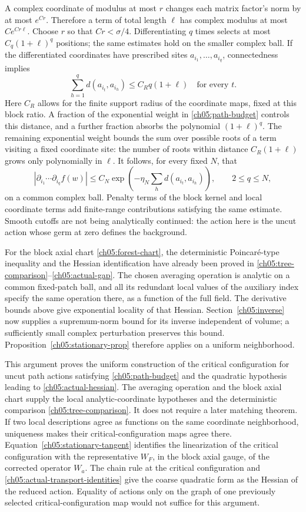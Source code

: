 A complex coordinate of modulus at most $r$ changes each matrix
factor's norm by at most $e^{Cr}$. Therefore a term of total
length $\ell$ has complex modulus at most $Ce^{Cr\ell}$.
Choose $r$ so that $Cr<\sigma/4$. Differentiating $q$ times
selects at most $C_q(1+\ell)^q$ positions; the same estimates
hold on the smaller complex ball. If the differentiated
coordinates have prescribed sites $a_{i_1},\ldots,a_{i_q}$,
connectedness implies
\[
 \sum_{h=1}^q d(a_{i_t},a_{i_h})\le C_R q(1+\ell)
             \quad\text{for every }t .
\]
Here $C_R$ allows for the finite support radius of the coordinate
maps, fixed at this block ratio. A fraction of the exponential
weight in \eqref{ch05:path-budget} controls this distance, and a
further fraction absorbs the polynomial $(1+\ell)^q$.
The remaining exponential weight bounds the sum over possible
roots of a term visiting a fixed coordinate site: the number of roots
within distance $C_R(1+\ell)$ grows only polynomially in $\ell$.
It follows, for every fixed $N$, that
\[
 |\partial_{i_1}\cdots\partial_{i_q}f(w)|
 \le C_N\exp\left(-\eta_N
                 \sum_h d(a_{i_t},a_{i_h})\right),
 \qquad 2\le q\le N ,
\]
on a common complex ball. Penalty terms of the block kernel and
local coordinate terms add finite-range contributions satisfying
the same estimate. Smooth cutoffs are not being analytically
continued: the action here is the uncut action whose germ at
zero defines the background.

For the block axial chart \eqref{ch05:forest-chart}, the deterministic
Poincar\'e-type inequality and the Hessian identification have already been proved
in \eqref{ch05:tree-comparison}--\eqref{ch05:actual-gap}. The chosen
averaging operation is analytic on a common fixed-patch ball, and all its redundant
local values of the auxiliary index specify the same operation there, as a function of the full field.
The derivative bounds above give exponential locality of that
Hessian. Section~\ref{ch05:inverse} now supplies a supremum-norm
bound for its inverse independent of volume; a sufficiently
small complex perturbation preserves this bound.
Proposition~\ref{ch05:stationary-prop} therefore applies on a
uniform neighborhood.

This argument proves the uniform construction of the critical configuration for
uncut path actions satisfying \eqref{ch05:path-budget} and the
quadratic hypothesis leading to
\eqref{ch05:actual-hessian}. The averaging operation and the block axial chart
supply the local analytic-coordinate hypotheses and the deterministic
comparison \eqref{ch05:tree-comparison}. It does not require
a later matching theorem. If two local descriptions agree
as functions on the same coordinate neighborhood, uniqueness
makes their critical-configuration maps agree there.
Equation~\eqref{ch05:stationary-tangent} identifies the linearization of the critical configuration with
the representative $W_F$, in the block axial gauge, of the corrected operator $W_a$.
The chain rule at the critical configuration and \eqref{ch05:actual-transport-identities}
give the coarse quadratic form as the Hessian of the reduced action. Equality of actions only on the
graph of one previously selected critical-configuration map would not suffice for this argument.

